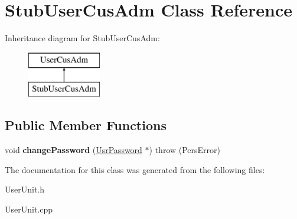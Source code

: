 \hypertarget{classStubUserCusAdm}{\section{Stub\-User\-Cus\-Adm Class Reference}
\label{d1/d9d/classStubUserCusAdm}
}
Inheritance diagram for Stub\-User\-Cus\-Adm\-:\begin{figure}[H]
\begin{center}
\leavevmode
\includegraphics[height=2.000000cm]{d1/d9d/classStubUserCusAdm}
\end{center}
\end{figure}
\subsection*{Public Member Functions}
\begin{DoxyCompactItemize}
\item 
\hypertarget{classStubUserCusAdm_a7e44bec3dc4fb0640e6eb418dd8e8320}{void {\bfseries change\-Password} (\hyperlink{classUsrPassword}{Usr\-Password} $\ast$)  throw (\-Pers\-Error)}\label{d1/d9d/classStubUserCusAdm_a7e44bec3dc4fb0640e6eb418dd8e8320}

\end{DoxyCompactItemize}


The documentation for this class was generated from the following files\-:\begin{DoxyCompactItemize}
\item 
User\-Unit.\-h\item 
User\-Unit.\-cpp\end{DoxyCompactItemize}
